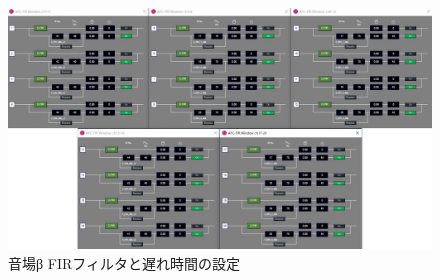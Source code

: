 \documentclass[11pt,a4j]{jreport}
\begin{document}
\begin{figure}[H]
  \centering
  \includegraphics[width=.8\linewidth]{images/experimentField/afcParameters/02beta/02FIR.jpg}
  \caption{音場β FIRフィルタと遅れ時間の設定}
  \label{fig:betaFIRフィルタの設定}
\end{figure}
\end{document}
